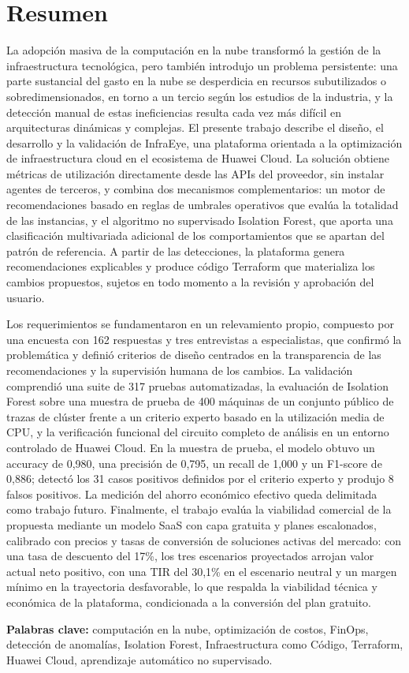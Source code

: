 \chapter*{Resumen}
{}

La adopción masiva de la computación en la nube transformó la gestión de la infraestructura tecnológica, pero también introdujo un problema persistente: una parte sustancial del gasto en la nube se desperdicia en recursos subutilizados o sobredimensionados, en torno a un tercio según los estudios de la industria, y la detección manual de estas ineficiencias resulta cada vez más difícil en arquitecturas dinámicas y complejas. El presente trabajo describe el diseño, el desarrollo y la validación de InfraEye, una plataforma orientada a la optimización de infraestructura cloud en el ecosistema de Huawei Cloud. La solución obtiene métricas de utilización directamente desde las APIs del proveedor, sin instalar agentes de terceros, y combina dos mecanismos complementarios: un motor de recomendaciones basado en reglas de umbrales operativos que evalúa la totalidad de las instancias, y el algoritmo no supervisado Isolation Forest, que aporta una clasificación multivariada adicional de los comportamientos que se apartan del patrón de referencia. A partir de las detecciones, la plataforma genera recomendaciones explicables y produce código Terraform que materializa los cambios propuestos, sujetos en todo momento a la revisión y aprobación del usuario.

Los requerimientos se fundamentaron en un relevamiento propio, compuesto por una encuesta con 162 respuestas y tres entrevistas a especialistas, que confirmó la problemática y definió criterios de diseño centrados en la transparencia de las recomendaciones y la supervisión humana de los cambios. La validación comprendió una suite de 317 pruebas automatizadas, la evaluación de Isolation Forest sobre una muestra de prueba de 400 máquinas de un conjunto público de trazas de clúster frente a un criterio experto basado en la utilización media de CPU, y la verificación funcional del circuito completo de análisis en un entorno controlado de Huawei Cloud. En la muestra de prueba, el modelo obtuvo un accuracy de 0,980, una precisión de 0,795, un recall de 1,000 y un F1-score de 0,886; detectó los 31 casos positivos definidos por el criterio experto y produjo 8 falsos positivos. La medición del ahorro económico efectivo queda delimitada como trabajo futuro. Finalmente, el trabajo evalúa la viabilidad comercial de la propuesta mediante un modelo SaaS con capa gratuita y planes escalonados, calibrado con precios y tasas de conversión de soluciones activas del mercado: con una tasa de descuento del 17\%, los tres escenarios proyectados arrojan valor actual neto positivo, con una TIR del 30,1\% en el escenario neutral y un margen mínimo en la trayectoria desfavorable, lo que respalda la viabilidad técnica y económica de la plataforma, condicionada a la conversión del plan gratuito.

\vspace{1cm}

\noindent\textbf{Palabras clave:} computación en la nube, optimización de costos, FinOps, detección de anomalías, Isolation Forest, Infraestructura como Código, Terraform, Huawei Cloud, aprendizaje automático no supervisado.
